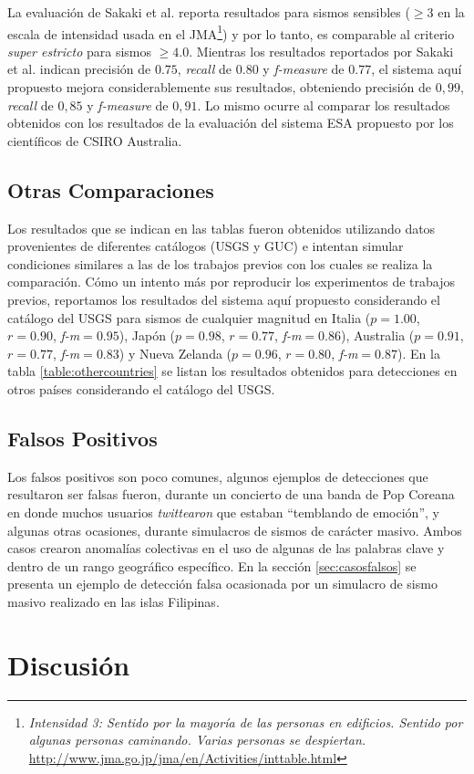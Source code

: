 La evaluación de Sakaki et al. reporta resultados para sismos sensibles ($\geq 3$ en la escala de intensidad usada en el JMA\footnote{{\em Intensidad 3: Sentido por la mayoría de las personas en edificios. Sentido por algunas personas caminando. Varias personas se despiertan.} \url{http://www.jma.go.jp/jma/en/Activities/inttable.html} }) y por lo tanto, es comparable al criterio {\em super estricto} para sismos $\geq 4.0$. Mientras los resultados reportados por Sakaki et al. indican precisión de $0.75$, {\em recall} de $0.80$ y {\em f-measure} de $0.77$, el sistema aquí propuesto mejora considerablemente sus resultados, obteniendo precisión de $0,99$, {\em recall} de $0,85$ y {\em f-measure} de $0,91$. Lo mismo ocurre al comparar los resultados obtenidos con los resultados de la evaluación del sistema ESA propuesto por los científicos de CSIRO Australia.  

\subsection{Otras Comparaciones}

Los resultados que se indican en las tablas fueron obtenidos utilizando datos provenientes de diferentes catálogos (USGS y GUC) e intentan simular condiciones similares a las de los trabajos previos con los cuales se realiza la comparación.
%
Cómo un intento más por reproducir los experimentos de trabajos previos, reportamos los resultados del sistema aquí propuesto considerando el catálogo del USGS para sismos de cualquier magnitud en Italia ($p=1.00$, $r=0.90$, {\em f-m}$=0.95$), Japón ($p=0.98$, $r=0.77$, {\em f-m}$=0.86$), Australia ($p=0.91$, $r=0.77$, {\em f-m}$=0.83$) y Nueva Zelanda ($p=0.96$, $r=0.80$, {\em f-m}$=0.87$).
%
En la tabla \ref{table:othercountries} se listan los resultados obtenidos para detecciones en otros países considerando el catálogo del USGS.

 
\subsection{Falsos Positivos}

Los falsos positivos son poco comunes, algunos ejemplos de detecciones que resultaron ser falsas fueron, durante un concierto de una banda de Pop Coreana en donde muchos usuarios \textit{twittearon} que estaban ``temblando de emoción'', y algunas otras ocasiones, durante simulacros de sismos de carácter masivo. Ambos casos crearon anomalías colectivas en el uso de algunas de las palabras clave y dentro de un rango geográfico específico. En la sección \ref{sec:casosfalsos} se presenta un ejemplo de detección falsa ocasionada por un simulacro de sismo masivo realizado en las islas Filipinas. 

\section{Discusión}
\label{sec:discusionEval}



